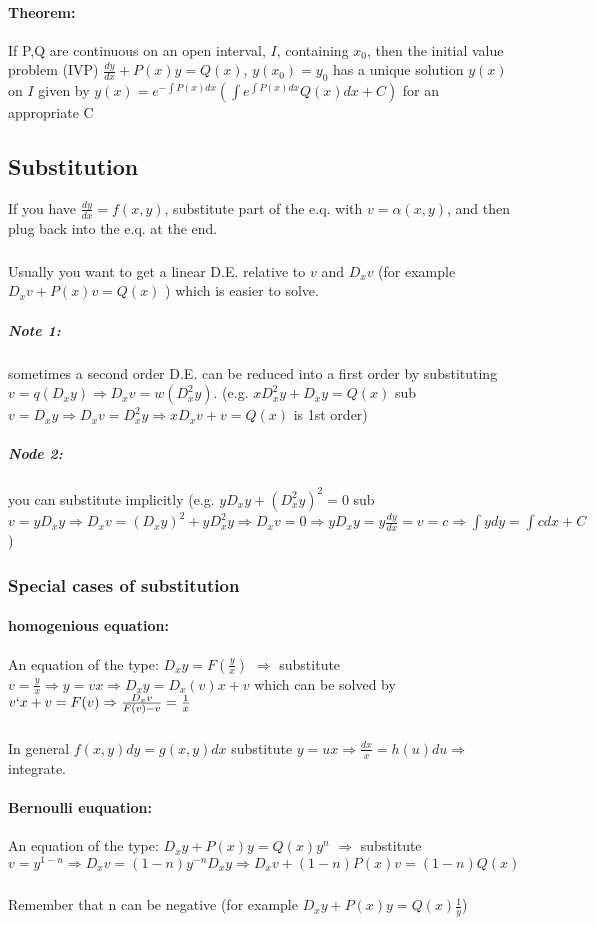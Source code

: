 \documentclass{article}
\begin{document}
\paragraph{Theorem:}
If P,Q are continuous on an open interval, $I$, containing $x_0$, then the initial value problem (IVP) $\frac{dy}{dx}+P(x)y=Q(x)$, $y(x_0)=y_0$ has a unique solution $y(x)$ on $I$ given by $y(x)=e^{-\int P(x)dx} \left(\displaystyle\int e^{\int P(x)dx}Q(x)dx + C \right)$ for an appropriate C
\subsection{Substitution}
If you have $\frac {dy}{dx} = f(x,y)$, substitute part of the e.q. with $v=\alpha (x,y)$, and then plug back into the e.q. at the end.
\subparagraph{}
Usually you want to get a linear D.E. relative to $v$ and $D_x v$ (for example $D_x v + P(x)v = Q(x)$ ) which is easier to solve.
\subparagraph{Note 1:}
sometimes a second order D.E. can be reduced into a first order by substituting $v=q(D_x y) \Rightarrow D_x v=w(D_x^2 y)$. (e.g. $x D_x^2 y + D_xy = Q(x)$ sub $v= D_x y \Rightarrow D_x v = D_x^2 y \Rightarrow x D_x v + v = Q(x)$ is 1st order)
\subparagraph{Node 2:}
you can substitute implicitly (e.g. $y D_x y + (D_x^2 y)^2=0$ sub $v=y D_x y \Rightarrow D_x v = (D_x y) ^2 + y D_x^2 y \Rightarrow D_x v = 0 \Rightarrow y D_x y = y \frac{dy}{dx}=v=c \Rightarrow \int ydy= \int cdx + C$)

\subsubsection{Special cases of substitution}
\paragraph{homogenious equation:}
An equation of the type: $D_x y=F(\frac{y}{x})$ $\Rightarrow$ substitute $v=\frac{y}{x} \Rightarrow y=vx \Rightarrow D_x y=D_x(v)x+v$ which can be solved by $v`x+v=F(v) \Rightarrow \frac{D_x v}{F(v)-v} = \frac{1}{x}$
\subparagraph{}
In general $f(x,y)dy=g(x,y)dx$ substitute $y=ux \Rightarrow \frac{dx}{x} = h(u)du \Rightarrow$ integrate.
\paragraph{Bernoulli euquation:}
An equation of the type: $D_x y+P(x)y=Q(x)y^n$ $\Rightarrow$ substitute $v=y^{1-n} \Rightarrow D_x v=(1-n)y^{-n} D_xy \Rightarrow D_x v+(1-n)P(x)v=(1-n)Q(x)$
\subparagraph{}
Remember that n can be negative (for example $D_x y+P(x)y=Q(x)\frac{1}{y}$)
\end{document}
